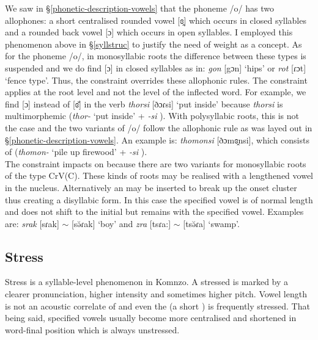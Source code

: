 We saw in \S{}\ref{phonetic-description-vowels} that the phoneme /o/ has two allophones: a short centralised rounded vowel [ɞ̯] which occurs in closed syllables and a rounded back vowel [ɔ] which occurs in open syllables. I employed this phenomenon above in \S{}\ref{syllstruc} to justify the need of  weight as a concept. As for the phoneme /o/, in monosyllabic roots the difference between these  types is suspended and we do find [ɔ] in closed syllables as in: \emph{gon} [gɔn] `hips' or \emph{rot} [ɾɔt] `fence type'. Thus, the  constraint overrides these allophonic rules. The constraint applies at the root level and not the level of the inflected word. For example, we find [ɔ] instead of [ɞ̆] in the verb \emph{thorsi} [ðɔɾsi] `put inside' because \emph{thorsi} is multimorphemic (\emph{thor-} `put inside' + \emph{-si} \Nmlz{}). With polysyllabic roots, this is not the case and the two variants of /o/ follow the allophonic rule as was layed out in \S{}\ref{phonetic-description-vowels}. An example is: \emph{thomonsi} [ðɔmɞ̯nsi], which consists of (\emph{thomon-} `pile up firewood' + \emph{-si} \Nmlz{}).\\

The  constraint impacts on  because there are two variants for monosyllabic roots of the type CrV(C). These kinds of roots may be realised with a lengthened vowel in the nucleus. Alternatively an  may be inserted to break up the onset cluster thus creating a disyllabic form. In this case the specified vowel is of normal length and  does not shift to the initial  but remains with the specified vowel. Examples are: \emph{srak} [sɾak] $\sim$ [sə̆ɾak] `boy' and \emph{zra} [tsɾa:] $\sim$ [tsə̆ɾa] `swamp'.

\subsection{Stress} \label{stress}

Stress is a syllable-level phenomenon in Komnzo. A stressed  is marked by a clearer pronunciation, higher intensity and sometimes higher pitch. Vowel length is not an acoustic correlate of  and even the  (a short ) is frequently stressed. That being said, specified vowels usually become more centralised and shortened in word-final position which is always unstressed.\\


